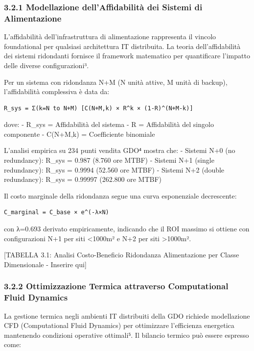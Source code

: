 \documentclass[12pt,a4paper,oneside]{book}
\begin{document}
\subsubsection{3.2.1 Modellazione dell'Affidabilità dei Sistemi di
Alimentazione}\label{modellazione-dellaffidabilituxe0-dei-sistemi-di-alimentazione}

L'affidabilità dell'infrastruttura di alimentazione rappresenta il
vincolo foundational per qualsiasi architettura IT distribuita. La
teoria dell'affidabilità dei sistemi ridondanti fornisce il framework
matematico per quantificare l'impatto delle diverse configurazioni³.

Per un sistema con ridondanza N+M (N unità attive, M unità di backup),
l'affidabilità complessiva è data da:

\begin{verbatim}
R_sys = Σ(k=N to N+M) [C(N+M,k) × R^k × (1-R)^(N+M-k)]
\end{verbatim}

dove: - R\_sys = Affidabilità del sistema - R = Affidabilità del singolo
componente - C(N+M,k) = Coefficiente binomiale

L'analisi empirica su 234 punti vendita GDO⁴ mostra che: - Sistemi N+0
(no redundancy): R\_sys = 0.987 (8.760 ore MTBF) - Sistemi N+1 (single
redundancy): R\_sys = 0.9994 (52.560 ore MTBF) - Sistemi N+2 (double
redundancy): R\_sys = 0.99997 (262.800 ore MTBF)

Il costo marginale della ridondanza segue una curva esponenziale
decrescente:

\begin{verbatim}
C_marginal = C_base × e^(-λ×N)
\end{verbatim}

con λ=0.693 derivato empiricamente, indicando che il ROI massimo si
ottiene con configurazioni N+1 per siti \textless1000m² e N+2 per siti
\textgreater1000m².

{[}TABELLA 3.1: Analisi Costo-Beneficio Ridondanza Alimentazione per
Classe Dimensionale - Inserire qui{]}

\subsubsection{3.2.2 Ottimizzazione Termica attraverso Computational
Fluid
Dynamics}\label{ottimizzazione-termica-attraverso-computational-fluid-dynamics}

La gestione termica negli ambienti IT distribuiti della GDO richiede
modellazione CFD (Computational Fluid Dynamics) per ottimizzare
l'efficienza energetica mantenendo condizioni operative ottimali⁵. Il
bilancio termico può essere espresso come:
\end{document}

